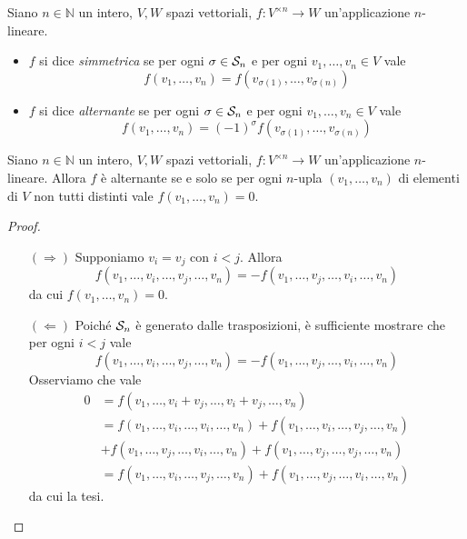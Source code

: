 \begin{definition}
Siano $n\in\mathbb{N}$ un intero, $V\comma W$ spazi vettoriali, $f:V^{\times n}\to W$ un'applicazione $n$-lineare.
\begin{itemize}
\item $f$ si dice \emph{simmetrica} se per ogni $\sigma\in \mathcal{S}_n$ e per ogni $v_1,\ldots,v_n\in V$ vale
$$
f(v_1,\ldots,v_n)=f(v_{\sigma(1)},\ldots,v_{\sigma(n)})
$$
\item $f$ si dice \emph{alternante} se per ogni $\sigma\in \mathcal{S}_n$ e per ogni $v_1,\ldots,v_n\in V$ vale
$$
f(v_1,\ldots,v_n)=(-1)^\sigma f(v_{\sigma(1)},\ldots,v_{\sigma(n)})
$$
\end{itemize}
\end{definition}

\begin{proposition}
Siano $n\in\mathbb{N}$ un intero, $V\comma W$ spazi vettoriali, $f:V^{\times n}\to W$ un'applicazione $n$-lineare. Allora $f$ è alternante se e solo se per ogni $n$-upla $(v_1,\ldots,v_n)$ di elementi di $V$ non tutti distinti vale $f(v_1,\ldots,v_n)=0$.
\end{proposition}
\begin{proof}
\leavevmode
\begin{itemize}
\item[$(\Rightarrow)$] Supponiamo $v_i=v_j$ con $i<j$. Allora
$$
f(v_1,\ldots,v_i,\ldots,v_j,\ldots,v_n)=-f(v_1,\ldots,v_j,\ldots,v_i,\ldots,v_n)
$$
da cui $f(v_1,\ldots,v_n)=0$.
\item[$(\Leftarrow)$] Poiché $\mathcal{S}_n$ è generato dalle trasposizioni, è sufficiente mostrare che per ogni $i<j$ vale
$$
f(v_1,\ldots,v_i,\ldots,v_j,\ldots,v_n)=-f(v_1,\ldots,v_j,\ldots,v_i,\ldots,v_n)
$$
Osserviamo che vale
\begin{align*}
0&=f(v_1,\ldots,v_i+v_j,\ldots,v_i+v_j,\ldots,v_n)\\
&=f(v_1,\ldots,v_i,\ldots,v_i,\ldots,v_n)+f(v_1,\ldots,v_i,\ldots,v_j,\ldots,v_n)\\
&+f(v_1,\ldots,v_j,\ldots,v_i,\ldots,v_n)+f(v_1,\ldots,v_j,\ldots,v_j,\ldots,v_n)\\
&=f(v_1,\ldots,v_i,\ldots,v_j,\ldots,v_n)+f(v_1,\ldots,v_j,\ldots,v_i,\ldots,v_n)
\end{align*}
da cui la tesi.
\end{itemize}
\end{proof}

